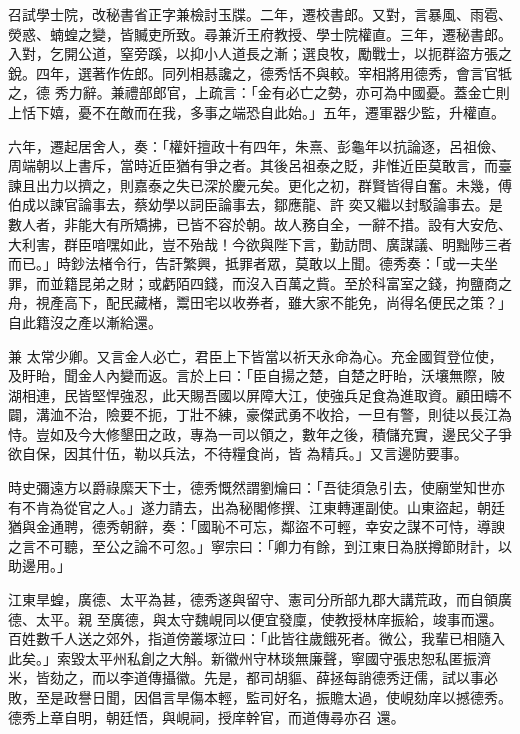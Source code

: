 \begin{pinyinscope}
 召試學士院，改秘書省正字兼檢討玉牒。二年，遷校書郎。又對，言暴風、雨雹、熒惑、蝻蝗之變，皆贓吏所致。尋兼沂王府教授、學士院權直。三年，遷秘書郎。入對，乞開公道，窒旁蹊，以抑小人道長之漸；選良牧，勵戰士，以扼群盜方張之銳。四年，選著作佐郎。同列相惎讒之，德秀恬不與較。宰相將用德秀，會言官牴之，德
 秀力辭。兼禮部郎官，上疏言：「金有必亡之勢，亦可為中國憂。蓋金亡則上恬下嬉，憂不在敵而在我，多事之端恐自此始。」五年，遷軍器少監，升權直。



 六年，遷起居舍人，奏：「權奸擅政十有四年，朱熹、彭龜年以抗論逐，呂祖儉、周端朝以上書斥，當時近臣猶有爭之者。其後呂祖泰之貶，非惟近臣莫敢言，而臺諫且出力以擠之，則嘉泰之失已深於慶元矣。更化之初，群賢皆得自奮。未幾，傅伯成以諫官論事去，蔡幼學以詞臣論事去，鄒應龍、許
 奕又繼以封駁論事去。是數人者，非能大有所矯拂，已皆不容於朝。故人務自全，一辭不措。設有大安危、大利害，群臣喑嘿如此，豈不殆哉！今欲與陛下言，勤訪問、廣謀議、明黜陟三者而已。」時鈔法楮令行，告訐繁興，抵罪者眾，莫敢以上聞。德秀奏：「或一夫坐罪，而並籍昆弟之財；或虧陌四錢，而沒入百萬之貲。至於科富室之錢，拘鹽商之舟，視產高下，配民藏楮，鬻田宅以收券者，雖大家不能免，尚得名便民之策？」自此籍沒之產以漸給還。



 兼
 太常少卿。又言金人必亡，君臣上下皆當以祈天永命為心。充金國賀登位使，及盱眙，聞金人內變而返。言於上曰：「臣自揚之楚，自楚之盱眙，沃壤無際，陂湖相連，民皆堅悍強忍，此天賜吾國以屏障大江，使強兵足食為進取資。顧田疇不闢，溝洫不治，險要不扼，丁壯不練，豪傑武勇不收拾，一旦有警，則徒以長江為恃。豈如及今大修墾田之政，專為一司以領之，數年之後，積儲充實，邊民父子爭欲自保，因其什伍，勒以兵法，不待糧食尚，皆
 為精兵。」又言邊防要事。



 時史彌遠方以爵祿縻天下士，德秀慨然謂劉爚曰：「吾徒須急引去，使廟堂知世亦有不肯為從官之人。」遂力請去，出為秘閣修撰、江東轉運副使。山東盜起，朝廷猶與金通聘，德秀朝辭，奏：「國恥不可忘，鄰盜不可輕，幸安之謀不可恃，導諛之言不可聽，至公之論不可忽。」寧宗曰：「卿力有餘，到江東日為朕撙節財計，以助邊用。」



 江東旱蝗，廣德、太平為甚，德秀遂與留守、憲司分所部九郡大講荒政，而自領廣德、太平。親
 至廣德，與太守魏峴同以便宜發廩，使教授林庠振給，竣事而還。百姓數千人送之郊外，指道傍叢塚泣曰：「此皆往歲餓死者。微公，我輩已相隨入此矣。」索毀太平州私創之大斛。新徽州守林琰無廉聲，寧國守張忠恕私匿振濟米，皆劾之，而以李道傳攝徽。先是，都司胡貙、薛拯每誚德秀迂儒，試以事必敗，至是政譽日聞，因倡言旱傷本輕，監司好名，振贍太過，使峴劾庠以撼德秀。德秀上章自明，朝廷悟，與峴祠，授庠幹官，而道傳尋亦召
 還。




\end{pinyinscope}
